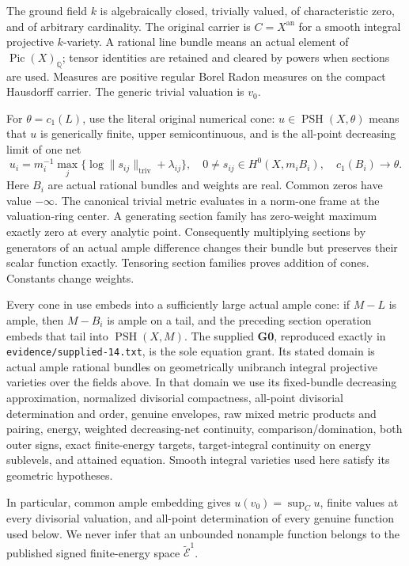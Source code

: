 \documentclass[
  10pt,
]{article}
\begin{document}
The ground field \(k\) is algebraically closed, trivially valued, of
characteristic zero, and of arbitrary cardinality. The original carrier
is \(C=X^{\mathrm{an}}\) for a smooth integral projective \(k\)-variety.
A rational line bundle means an actual element of
\(\operatorname{Pic}(X)_{\mathbb Q}\); tensor identities are retained
and cleared by powers when sections are used. Measures are positive
regular Borel Radon measures on the compact Hausdorff carrier. The
generic trivial valuation is \(v_0\).

For \(\theta=c_1(L)\), use the literal original numerical cone:
\(u\in\operatorname{PSH}(X,\theta)\) means that \(u\) is generically
finite, upper semicontinuous, and is the all-point decreasing limit of
one net \[
 u_i=m_i^{-1}\max_j\{\log\|s_{ij}\|_{\mathrm{triv}}+\lambda_{ij}\},
 \quad 0\ne s_{ij}\in H^0(X,m_iB_i),\quad c_1(B_i)\longrightarrow\theta.       \tag{1}
\] Here \(B_i\) are actual rational bundles and weights are real. Common
zeros have value \(-\infty\). The canonical trivial metric evaluates in
a norm-one frame at the valuation-ring center. A generating section
family has zero-weight maximum exactly zero at every analytic point.
Consequently multiplying sections by generators of an actual ample
difference changes their bundle but preserves their scalar function
exactly. Tensoring section families proves addition of cones. Constants
change weights.

Every cone in use embeds into a sufficiently large actual ample cone: if
\(M-L\) is ample, then \(M-B_i\) is ample on a tail, and the preceding
section operation embeds that tail into \(\operatorname{PSH}(X,M)\). The
supplied \textbf{G0}, reproduced exactly in
\texttt{evidence/supplied-14.txt}, is the sole equation grant. Its
stated domain is actual ample rational bundles on geometrically
unibranch integral projective varieties over the fields above. In that
domain we use its fixed-bundle decreasing approximation, normalized
divisorial compactness, all-point divisorial determination and order,
genuine envelopes, raw mixed metric products and pairing, energy,
weighted decreasing-net continuity, comparison/domination, both outer
signs, exact finite-energy targets, target-integral continuity on energy
sublevels, and attained equation. Smooth integral varieties used here
satisfy its geometric hypotheses.

In particular, common ample embedding gives \(u(v_0)=\sup_Cu\), finite
values at every divisorial valuation, and all-point determination of
every genuine function used below. We never infer that an unbounded
nonample function belongs to the published signed finite-energy space
\(\widetilde{\mathcal E}^{1}\).
\end{document}
